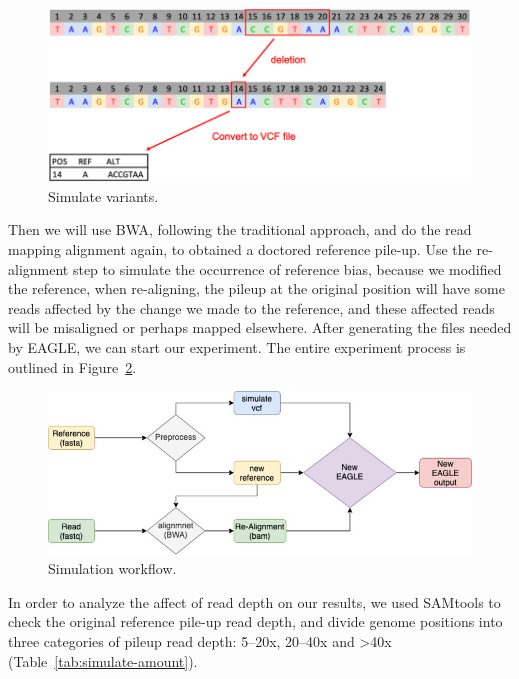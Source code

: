 \begin{figure}[ht]
\vspace{1em}
\includegraphics[width=1\columnwidth]{body/image/simulate_variants.png}
\caption[Simulate variants]{Simulate variants.}
\label{simulate_variants}
\end{figure}

Then we will use BWA, following the traditional approach, and do the read mapping alignment again, to obtained a doctored reference pile-up.  Use the re-alignment step to simulate the occurrence of reference bias, because we modified the reference, when re-aligning, the pileup at the original position will have some reads affected by the change we made to the reference, and these affected reads will be misaligned or perhaps mapped elsewhere. After generating the files needed by EAGLE, we can start our experiment.  The entire experiment process is outlined in Figure~\ref{simulation_workflow}.

\begin{figure}[ht]
\vspace{1em}
\includegraphics[width=1\columnwidth]{body/image/simulation_workflow.png}
\caption[Simulation workflow]{Simulation workflow.}
\label{simulation_workflow}
\end{figure}

In order to analyze the affect of read depth on our results, we used SAMtools to check the original reference pile-up read depth, and divide genome positions into three categories of pileup read depth: 5--20x, 20--40x and \textgreater40x (Table~\ref{tab:simulate-amount}).


